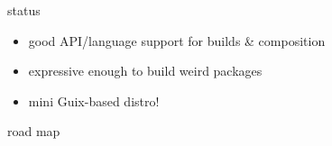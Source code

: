 \documentclass{beamer}
\begin{document}
\begin{frame}{status}
  \begin{itemize}
  \item good API/language support for builds \& composition
  \item expressive enough to build weird packages
  \item<2-> mini Guix-based distro!
  \end{itemize}
\end{frame}

\begin{frame}{road map}
\end{frame}





\end{document}
